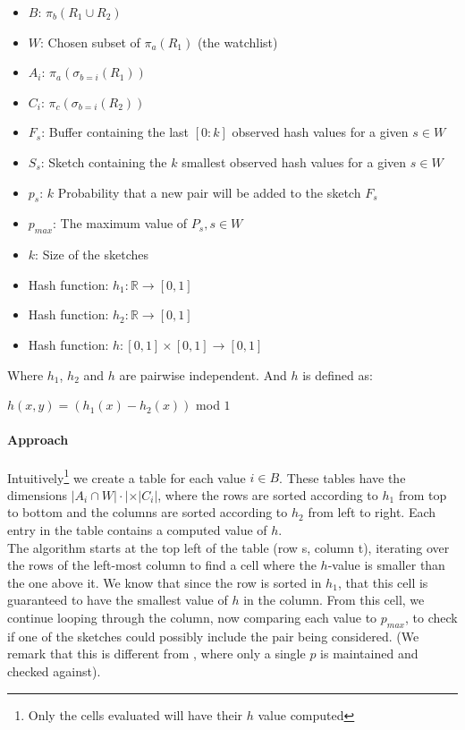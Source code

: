 \documentclass[a4paper,11pt]{article}
\begin{document}
\begin{itemize}
  \item $B$: $\pi_{b}(R_1 \cup R_2)$
  \item $W$: Chosen subset of $\pi_{a}(R_1)$ (the watchlist)
  \item $A_i$: $\pi_{a}(\sigma_{b=i}(R_1))$
  \item $C_i$: $\pi_{c}(\sigma_{b=i}(R_2))$
  \item $F_s$: Buffer containing the last $[0:k]$ observed hash values for a given $s \in W$
  \item $S_s$: Sketch containing the $k$ smallest observed hash values for a given $s \in W$
  \item $p_s$: $k$ Probability that a new pair will be added to the sketch $F_s$
  \item $p_{max}$: The maximum value of $P_s, s \in W$
  \item $k$: Size of the sketches
  \item Hash function: $h_1 : \mathbb{R} \rightarrow [0,1]$
  \item Hash function: $h_2 : \mathbb{R} \rightarrow [0,1]$
  \item Hash function: $h : [0,1] \times [0,1] \rightarrow [0,1]$
\end{itemize} 
Where $h_1$, $h_2$ and $h$ are pairwise independent. And $h$ is defined as:
\begin{center}
$h(x,y) = (h_1(x) - h_2(x))$ mod $1$
\end{center}

\paragraph{Approach}
Intuitively\footnote{Only the cells evaluated will have their $h$ value computed} we create a table for each value $i \in B$. These tables have the dimensions $|A_i\cap W|\cdot | \times |C_i|$, where the rows are sorted according to $h_1$ from top to bottom and the columns are sorted according to $h_2$ from left to right. Each entry in the table contains a computed value of $h$.\\

The algorithm starts at the top left of the table (row s, column t), iterating over the rows of the left-most column to find a cell where the $h$-value is smaller than the one above it. We know that since the row is sorted in $h_1$, that this cell is guaranteed to have the smallest value of $h$ in the column. From this cell, we continue looping through the column, now comparing each value to $p_{max}$, to check if one of the sketches could possibly include the pair being considered. (We remark that this is different from \cite{paper:amossen}, where only a single $p$ is maintained and checked against). \\
\end{document}
